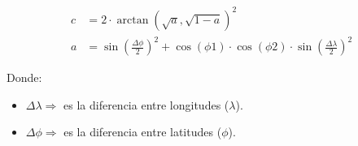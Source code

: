 \documentclass[12pt,letterpaper,oneside]{book}
\begin{document}
\begin{equation} \label{eq:haversine}
\begin{split}
c & = 2 \cdot \arctan (\sqrt{a} ,\sqrt{1-a} )^{2} \\
a & = \sin(\frac{\Delta\phi}{2})^{2} + \cos(\phi 1) \cdot \cos(\phi 2) \cdot \sin(\frac{\Delta\lambda}{2})^{2} 
\end{split}
\end{equation}

Donde:
\begin{itemize}
\item $\Delta\lambda \Rightarrow$ es la diferencia entre longitudes ($\lambda$).
\item $\Delta\phi \Rightarrow$ es la diferencia entre latitudes ($\phi$).
\end{itemize}
\end{document}
